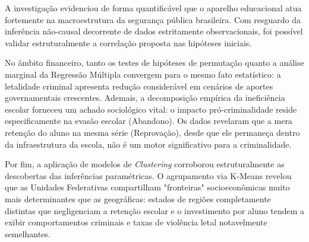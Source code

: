 \documentclass[10pt]{article}
\begin{document}
A investigação evidenciou de forma quantificável que o aparelho educacional atua fortemente na macroestrutura da segurança pública brasileira. Com resguardo da inferência não-causal decorrente de dados estritamente observacionais, foi possível validar estruturalmente a correlação proposta nas hipóteses iniciais.

No âmbito financeiro, tanto os testes de hipóteses de permutação quanto a análise marginal da Regressão Múltipla convergem para o mesmo fato estatístico: a letalidade criminal apresenta redução considerável em cenários de aportes governamentais crescentes. Ademais, a decomposição empírica da ineficiência escolar forneceu um achado sociológico vital: o impacto pró-criminalidade reside especificamente na evasão escolar (Abandono). Os dados revelaram que a mera retenção do aluno na mesma série (Reprovação), desde que ele permaneça dentro da infraestrutura da escola, não é um motor significativo para a criminalidade.

Por fim, a aplicação de modelos de \textit{Clustering} corroborou estruturalmente as descobertas das inferências paramétricas. O agrupamento via K-Means revelou que as Unidades Federativas compartilham "fronteiras" socioeconômicas muito mais determinantes que as geográficas: estados de regiões completamente distintas que negligenciam a retenção escolar e o investimento por aluno tendem a exibir comportamentos criminais e taxas de violência letal notavelmente semelhantes.
\end{document}
